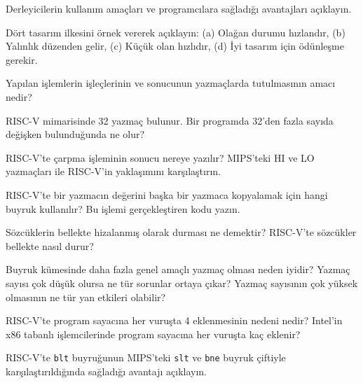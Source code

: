 \begin{alistirma}[\kolay]
Derleyicilerin kullanım amaçları ve programcılara sağladığı avantajları açıklayın.
\end{alistirma}

\begin{alistirma}[\orta]
Dört tasarım ilkesini örnek vererek açıklayın: (a) Olağan durumu hızlandır, (b) Yalınlık düzenden gelir, (c) Küçük olan hızlıdır, (d) İyi tasarım için ödünleşme gerekir.
\end{alistirma}

\begin{alistirma}[\kolay]
Yapılan işlemlerin işleçlerinin ve sonucunun yazmaçlarda tutulmasının amacı nedir?
\end{alistirma}

\begin{alistirma}[\orta]
RISC-V mimarisinde 32 yazmaç bulunur. Bir programda 32'den fazla sayıda değişken bulunduğunda ne olur?
\end{alistirma}

\begin{alistirma}[\orta]
RISC-V'te çarpma işleminin sonucu nereye yazılır? MIPS'teki HI ve LO yazmaçları ile RISC-V'in yaklaşımını karşılaştırın.
\end{alistirma}

\begin{alistirma}[\kolay]
RISC-V'te bir yazmacın değerini başka bir yazmaca kopyalamak için hangi buyruk kullanılır? Bu işlemi gerçekleştiren kodu yazın.
\end{alistirma}

\begin{alistirma}[\kolay]
Sözcüklerin bellekte hizalanmış olarak durması ne demektir? RISC-V'te sözcükler bellekte nasıl durur?
\end{alistirma}

\begin{alistirma}[\orta]
Buyruk kümesinde daha fazla genel amaçlı yazmaç olması neden iyidir? Yazmaç sayısı çok düşük olursa ne tür sorunlar ortaya çıkar? Yazmaç sayısının çok yüksek olmasının ne tür yan etkileri olabilir?
\end{alistirma}

\begin{alistirma}[\orta]
RISC-V'te program sayacına her vuruşta 4 eklenmesinin nedeni nedir? Intel'in x86 tabanlı işlemcilerinde program sayacına her vuruşta kaç eklenir?
\end{alistirma}

\begin{alistirma}[\orta]
RISC-V'te \texttt{blt} buyruğunun MIPS'teki \texttt{slt} ve \texttt{bne} buyruk çiftiyle karşılaştırıldığında sağladığı avantajı açıklayın.
\end{alistirma}

